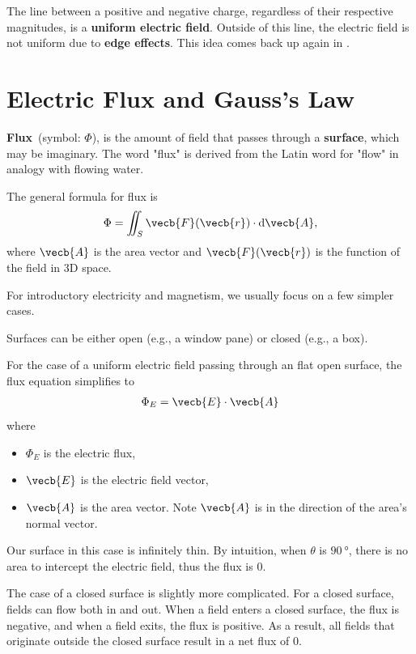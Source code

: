 The line between a positive and negative charge,
regardless of their respective magnitudes,
is a \textbf{uniform electric field}.
Outside of this line,
the electric field is not uniform due to \textbf{edge effects}.
This idea comes back up again in .

\section{Electric Flux and Gauss's Law}

\textbf{Flux}~(symbol: \(\Phi\)),
is the amount of field that passes through a \textbf{surface},
which may be imaginary.
The word "flux" is derived from the Latin word for "flow"
in analogy with flowing water.

The general formula for flux is
\begin{equation}
    \Phi = \iint_S \vecb{F}(\vecb{r}) \cdot \odif{\vecb{A}},
\end{equation}
where \(\vecb{A}\) is the area vector
and \(\vecb{F}(\vecb{r})\) is the function of the field in 3D space.

For introductory electricity and magnetism,
we usually focus on a few simpler cases.

Surfaces can be either open (e.g., a window pane) or closed (e.g., a box).

For the case of a uniform electric field passing through an flat open surface,
the flux equation simplifies to
\begin{equation}
    \begin{aligned}
        \Phi_E = \vecb{E} \cdot \vecb{A}
    \end{aligned}
\end{equation}
where
\begin{itemize}
    \item \(\Phi_E\) is the electric flux,
    \item \(\vecb{E}\) is the electric field vector,
    \item \(\vecb{A}\) is the area vector.
        Note \(\vecb{A}\) is in the direction of the area's normal vector.
\end{itemize}
Our surface in this case is infinitely thin.
By intuition, when \(\theta\) is \(\qty{90}{\degree}\),
there is no area to intercept the electric field,
thus the flux is 0.

The case of a closed surface is slightly more complicated.
For a closed surface, fields can flow both in and out.
When a field enters a closed surface, the flux is negative,
and when a field exits, the flux is positive.
As a result,
all fields that originate outside the closed surface result in a net flux of 0.

